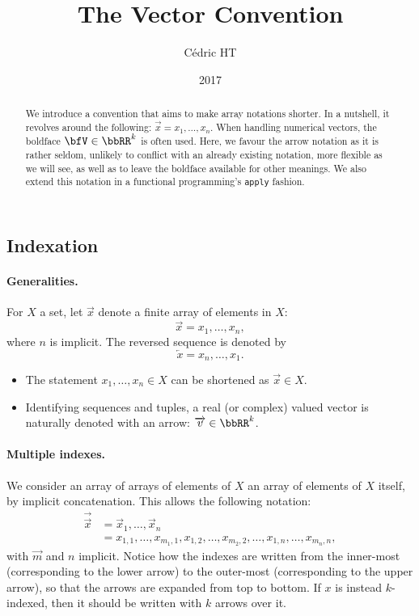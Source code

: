 \documentclass[a4paper, 8pt]{article}
\title{The Vector Convention}
\author{Cédric HT}
\date{2017}
\begin{document}
\begin{multicols}{2}

\maketitle

\begin{abstract}
	We introduce a convention that aims to make array notations shorter. In a nutshell, it revolves around the following: $\overrightarrow{x} = x_1, \ldots, x_n$. When handling numerical vectors, the boldface $\bfV \in \bbRR^k$ is often used. Here, we favour the arrow notation as it is rather seldom, unlikely to conflict with an already existing notation, more flexible as we will see, as well as to leave the boldface available for other meanings. We also extend this notation in a functional programming's \texttt{apply} fashion.
\end{abstract}

\section{Indexation}

\paragraph{Generalities.} For $X$ a set, let $\overrightarrow{x}$ denote a finite array of elements in $X$:
\[ \overrightarrow{x} = x_1, \ldots, x_n, \]
where $n$ is implicit. The reversed sequence is denoted by
\[ \overleftarrow{x} = x_n, \ldots, x_1 . \]

\begin{examples*}
	\begin{itemize}
		\item The statement $x_1, \ldots, x_n \in X$ can be shortened as $\overrightarrow{x} \in X$.
		\item Identifying sequences and tuples, a real (or complex) valued vector is naturally denoted with an arrow: $\overrightarrow{v} \in \bbRR^k$.
	\end{itemize}
\end{examples*}

\paragraph{Multiple indexes.} We consider an array of arrays of elements of $X$ an array of elements of $X$ itself, by implicit concatenation. This allows the following notation:
\begin{align*}
	\overrightarrow{\overrightarrow{x}} &= \overrightarrow{x}_1, \ldots, \overrightarrow{x}_n \\
	&= x_{1, 1}, \ldots, x_{m_1, 1}, x_{1, 2}, \ldots, x_{m_2, 2}, \ldots, x_{1, n}, \ldots, x_{m_n, n} ,
\end{align*}
with $\overrightarrow{m}$ and $n$ implicit. Notice how the indexes are written from the inner-most (corresponding to the lower arrow) to the outer-most (corresponding to the upper arrow), so that the arrows are expanded from top to bottom. If $x$ is instead $k$-indexed, then it should be written with $k$ arrows over it. 


\end{multicols}
\end{document}
